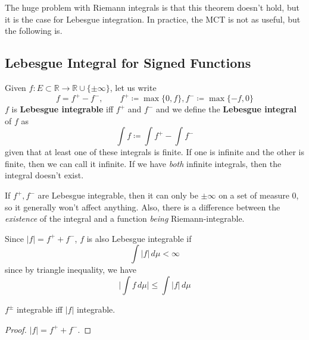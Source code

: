   The huge problem with Riemann integrals is that this theorem doesn't hold, but it is the case for Lebesgue integration. In practice, the MCT is not as useful, but the following is. 

\subsection{Lebesgue Integral for Signed Functions} 

  \begin{definition}
    Given $f: E \subset \mathbb{R} \to \mathbb{R} \cup \{\pm \infty\}$, let us write 
    \begin{equation}
      f = f^+ - f^-, \qquad f^+ \coloneqq \max \{0, f\}, f^- \coloneqq \max\{-f, 0\}
    \end{equation}
    $f$ is \textbf{Lebesgue integrable} iff $f^+$ and $f^-$ and we define the \textbf{Lebesgue integral} of $f$ as 
    \begin{equation}
      \int f \coloneqq \int f^+ - \int f^- 
    \end{equation}
    given that at least one of these integrals is finite. If one is infinite and the other is finite, then we can call it infinite. If we have \textit{both} infinite integrals, then the integral doesn't exist. 
  \end{definition} 

  If $f^+, f^-$ are Lebesgue integrable, then it can only be $\pm \infty$ on a set of measure $0$, so it generally won't affect anything. Also, there is a difference between the \textit{existence} of the integral and a function \textit{being} Riemann-integrable. 

  Since $|f| = f^+ + f^-$, $f$ is also Lebesgue integrable if 
  \begin{equation}
    \int |f| \, d\mu < \infty 
  \end{equation}
  since by triangle inequality, we have 
  \begin{equation}
    \bigg| \int f \, d\mu \bigg| \leq \int |f| \, d \mu
  \end{equation}

  \begin{theorem}
    $f^\pm$ integrable iff $|f|$ integrable. 
  \end{theorem}
  \begin{proof}
    $|f| = f^+ + f^-$. 
  \end{proof}

